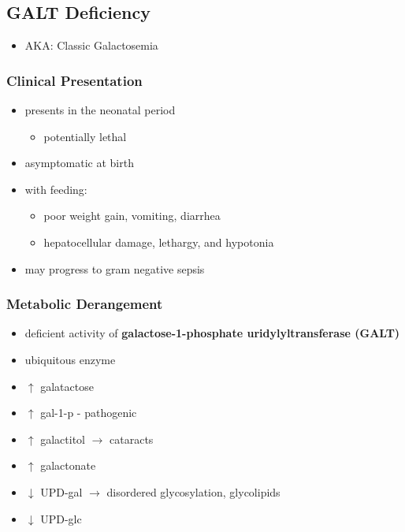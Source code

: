 \documentclass{scrartcl}
\begin{document}
\subsection{GALT Deficiency}
\label{sec:orgbb47a00}
\begin{itemize}
\item AKA: Classic Galactosemia
\end{itemize}
\subsubsection{Clinical Presentation}
\label{sec:orge61d9c5}
\begin{itemize}
\item presents in the neonatal period
\begin{itemize}
\item potentially lethal
\end{itemize}
\item asymptomatic at birth
\item with feeding:
\begin{itemize}
\item poor weight gain, vomiting, diarrhea
\item hepatocellular damage, lethargy, and hypotonia
\end{itemize}
\item may progress to gram negative sepsis
\end{itemize}

\subsubsection{Metabolic Derangement}
\label{sec:orgb15c279}
\begin{itemize}
\item deficient activity of \textbf{galactose-1-phosphate uridylyltransferase (GALT)}
\item ubiquitous enzyme
\item \(\uparrow\)  galatactose
\item \(\uparrow\) gal-1-p - pathogenic
\item \(\uparrow\) galactitol \(\to\) cataracts
\item \(\uparrow\) galactonate
\item \(\downarrow\) UPD-gal \(\to\) disordered glycosylation, glycolipids
\item \(\downarrow\) UPD-glc
\end{itemize}
\end{document}
